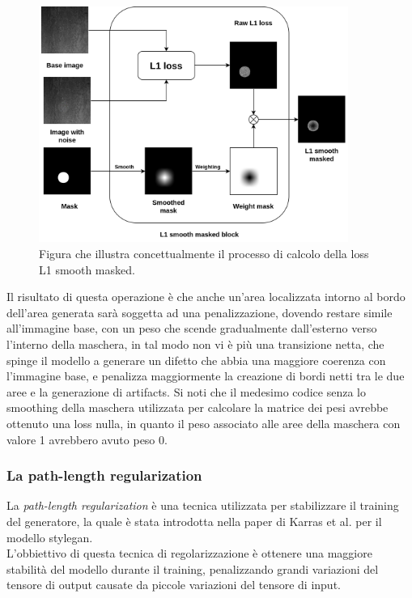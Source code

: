\begin{figure}[H]
    \centering
    \includegraphics[width=0.9\textwidth]{imgs/Coigan/L1_smooth_masked.png}
    \caption{Figura che illustra concettualmente il processo di calcolo della loss L1 smooth masked.}
    \label{fig:l1_smooth_masked_example}
\end{figure}

Il risultato di questa operazione è che anche un'area localizzata intorno al bordo dell'area generata sarà soggetta ad una penalizzazione, dovendo
restare simile all'immagine base, con un peso che scende gradualmente dall'esterno verso l'interno della maschera, in tal modo non vi è più 
una transizione netta, che spinge il modello a generare un difetto che abbia una maggiore coerenza con l'immagine base, e penalizza maggiormente la
creazione di bordi netti tra le due aree e la generazione di artifacts.
Si noti che il medesimo codice senza lo smoothing della maschera utilizzata per calcolare la matrice dei pesi avrebbe ottenuto 
una loss nulla, in quanto il peso associato alle aree della maschera con valore 1 avrebbero avuto peso 0.

\subsubsection{La path-length regularization}
La \textit{path-length regularization} è una tecnica utilizzata per stabilizzare il training del generatore, la quale è stata introdotta nella paper 
di Karras et al. \cite{karras2019stylegan} per il modello stylegan.\\
L'obbiettivo di questa tecnica di regolarizzazione è ottenere una maggiore stabilità del modello durante il training, penalizzando grandi variazioni del tensore di output
causate da piccole variazioni del tensore di input.

